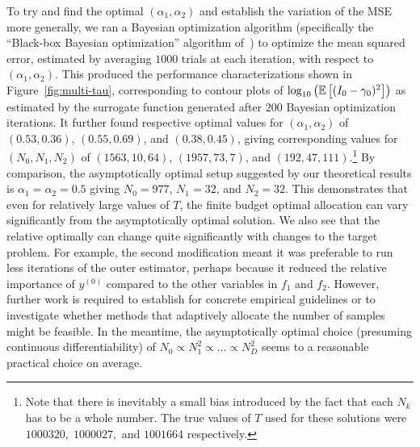 To 
try and find the optimal $(\alpha_1,\alpha_2)$ and establish the variation of the MSE more generally,
we ran a Bayesian optimization
algorithm (specifically the ``Black-box Bayesian optimization'' algorithm of~\cite{rainforth2015workshopbopp}) to
optimize the mean squared error, estimated by averaging $1000$ trials at each iteration, with respect to 
$(\alpha_1,\alpha_2)$.  This produced the performance characterizations shown in
Figure~\ref{fig:multi-tau}, corresponding to contour plots of $\log_{10} \left(\mathbb{E} \left[(I_0-\gamma_0)^2\right]\right)$ as
estimated by the surrogate function generated after $200$ Bayesian optimization iterations.
It further found respective optimal values for $(\alpha_1,\alpha_2)$ of  $(0.53,0.36)$, $(0.55,0.69)$, and $(0.38,0.45)$,
giving corresponding values for $(N_0,N_1,N_2)$
of $(1563,10,64)$, $(1957,73,7)$, and $(192,47,111)$.\footnote{Note that there is inevitably a small bias introduced
	by the fact that each $N_k$ has to be a whole number.  The true values of $T$ used for these solutions
	were $1000320,\; 1000027,$ and $1001664$ respectively.}  By comparison, the asymptotically optimal
setup suggested by our theoretical results is $\alpha_1=\alpha_2=0.5$ giving $N_0=977$, $N_1=32$, and 
$N_2=32$.
This demonstrates that even for relatively large values of $T$, the finite budget optimal allocation can vary significantly
from the asymptotically optimal solution.  We also see that the relative optimally can change quite significantly with
changes to the target problem.  For example, the second modification meant it was preferable to run less iterations of
the outer estimator, perhaps because it reduced the relative importance of $y^{(0)}$ compared to the other variables
in $f_1$ and $f_2$.  However, further work is required to
establish for concrete empirical guidelines or to investigate whether methods that adaptively allocate the number of
samples might be feasible.  In the meantime, the asymptotically optimal choice (presuming continuous differentiability) 
of $N_0 \propto N_1^2 \propto \dots \propto N_D^2$ seems to a reasonable practical choice on average.
